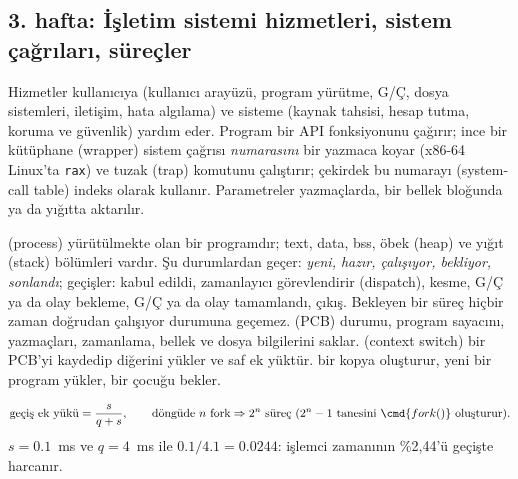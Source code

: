 \subsection{3. hafta: İşletim sistemi hizmetleri, sistem çağrıları, süreçler}
Hizmetler kullanıcıya (kullanıcı arayüzü, program yürütme, G/Ç, dosya sistemleri, iletişim, hata algılama) ve sisteme (kaynak tahsisi, hesap tutma, koruma ve güvenlik) yardım eder. Program bir API fonksiyonunu çağırır; ince bir kütüphane  (wrapper) sistem çağrısı \emph{numarasını} bir yazmaca koyar (x86-64 Linux'ta \texttt{rax}) ve tuzak (trap) komutunu çalıştırır; çekirdek bu numarayı  (system-call table) indeks olarak kullanır. Parametreler yazmaçlarda, bir bellek bloğunda ya da yığıtta aktarılır.

 (process) yürütülmekte olan bir programdır; text, data, bss, öbek (heap) ve yığıt (stack) bölümleri vardır. Şu durumlardan geçer: \emph{yeni, hazır, çalışıyor, bekliyor, sonlandı}; geçişler: kabul edildi, zamanlayıcı görevlendirir (dispatch), kesme, G/Ç ya da olay bekleme, G/Ç ya da olay tamamlandı, çıkış. Bekleyen bir süreç hiçbir zaman doğrudan çalışıyor durumuna geçemez.  (PCB) durumu, program sayacını, yazmaçları, zamanlama, bellek ve dosya bilgilerini saklar.  (context switch) bir PCB'yi kaydedip diğerini yükler ve saf ek yüktür.  bir kopya oluşturur,  yeni bir program yükler,  bir çocuğu bekler.
\begin{example}
\[
\text{geçiş ek yükü} = \frac{s}{q + s}, \qquad \text{döngüde } n \text{ fork} \Rightarrow 2^{n} \text{ süreç } (2^{n}-1 \text{ tanesini } \cmd{fork()} \text{ oluşturur}).
\]
$s = 0.1$~ms ve $q = 4$~ms ile $0.1/4.1 = 0.0244$: işlemci zamanının \%2,44'ü geçişte harcanır.
\end{example}

